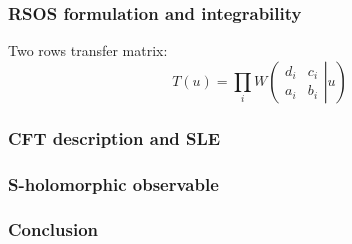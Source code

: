 \documentclass[pdftex]{beamer}
\theoremstyle{definition} \newtheorem{Def}{Definition}
\begin{document}
   \begin{frame}
     \frametitle{RSOS formulation and integrability}
     Two rows transfer matrix:
     \begin{equation}
       \label{eq:5}
       T(u)=\prod_{i} W\left(\left.\begin{array}{cc} d_{i} & c_{i}\\ a_{i} & b_{i}  \end{array} \right| u \right)
         
         \end{equation}
   \end{frame}
  \begin{frame}
    \frametitle{ CFT description and SLE }
  \end{frame}
  \begin{frame}
    \frametitle{ S-holomorphic observable}
  \end{frame}
  \begin{frame}
    \frametitle{ Conclusion}
  \end{frame}
{} 
  
\end{document}
